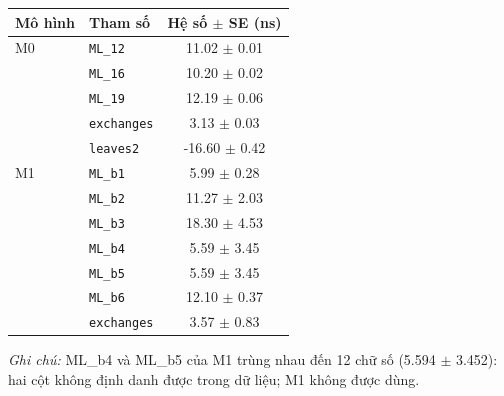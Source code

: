 \begin{tabular}{llc}
\toprule
Mô hình & Tham số & Hệ số $\pm$ SE (ns) \\
\midrule
M0 & \texttt{ML\_12} & 11.02 $\pm$ 0.01 \\
 & \texttt{ML\_16} & 10.20 $\pm$ 0.02 \\
 & \texttt{ML\_19} & 12.19 $\pm$ 0.06 \\
 & \texttt{exchanges} & 3.13 $\pm$ 0.03 \\
 & \texttt{leaves2} & -16.60 $\pm$ 0.42 \\
\addlinespace
M1 & \texttt{ML\_b1} & 5.99 $\pm$ 0.28 \\
 & \texttt{ML\_b2} & 11.27 $\pm$ 2.03 \\
 & \texttt{ML\_b3} & 18.30 $\pm$ 4.53 \\
 & \texttt{ML\_b4} & 5.59 $\pm$ 3.45 \\
 & \texttt{ML\_b5} & 5.59 $\pm$ 3.45 \\
 & \texttt{ML\_b6} & 12.10 $\pm$ 0.37 \\
 & \texttt{exchanges} & 3.57 $\pm$ 0.83 \\
\bottomrule
\end{tabular}
\medskip\par\raggedright\footnotesize
\textit{Ghi chú:} ML\_b4 và ML\_b5 của M1 trùng nhau đến 12 chữ số (5.594 $\pm$ 3.452): hai cột không định danh được trong dữ liệu; M1 không được dùng.
